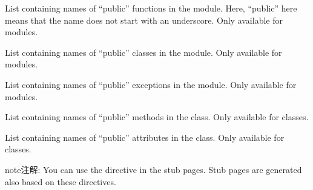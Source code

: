 \documentclass[letterpaper,10pt,english]{sphinxmanual}
\begin{document}

\begin{fulllineitems}
\label{ext/autosummary:functions}
List containing names of ``public'' functions in the module.  Here, ``public''
here means that the name does not start with an underscore. Only available
for modules.

\end{fulllineitems}


\begin{fulllineitems}
\label{ext/autosummary:classes}
List containing names of ``public'' classes in the module.  Only available for
modules.

\end{fulllineitems}


\begin{fulllineitems}
\label{ext/autosummary:exceptions}
List containing names of ``public'' exceptions in the module.  Only available
for modules.

\end{fulllineitems}


\begin{fulllineitems}
\label{ext/autosummary:methods}
List containing names of ``public'' methods in the class.  Only available for
classes.

\end{fulllineitems}


\begin{fulllineitems}
\label{ext/autosummary:attributes}
List containing names of ``public'' attributes in the class.  Only available
for classes.

\end{fulllineitems}


\begin{notice}{note}{注解:}
You can use the {\hyperref[ext/autosummary:directive\string-autosummary]{}} directive in the stub pages.
Stub pages are generated also based on these directives.
\end{notice}
\end{document}
